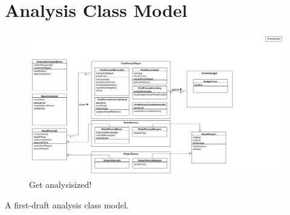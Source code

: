 \documentclass[a4paper,10pt]{article}
\begin{document}
\section{Analysis Class Model}
\begin{figure}[H]
	\begin{center}
		\includegraphics[scale=0.4]{images/AnalysisClassDiagram.png}
		\caption{Get analysisized!}
	\end{center}
\end{figure}
A first-draft analysis class model.
\end{document}
